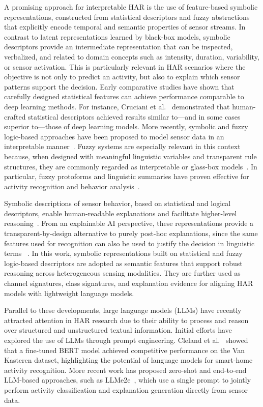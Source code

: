\documentclass[preprint,12pt]{elsarticle}
\begin{document}
A promising approach for interpretable HAR is the use of feature-based symbolic representations, constructed from statistical descriptors and fuzzy abstractions that explicitly encode temporal and semantic properties of sensor streams. In contrast to latent representations learned by black-box models, symbolic descriptors provide an intermediate representation that can be inspected, verbalized, and related to domain concepts such as intensity, duration, variability, or sensor activation. This is particularly relevant in HAR scenarios where the objective is not only to predict an activity, but also to explain which sensor patterns support the decision. Early comparative studies have shown that carefully designed statistical features can achieve performance comparable to deep learning methods. For instance, Cruciani et al.~\cite{cruciani2019comparing} demonstrated that human-crafted statistical descriptors achieved results similar to---and in some cases superior to---those of deep learning models. More recently, symbolic and fuzzy logic-based approaches have been proposed to model sensor data in an interpretable manner~\cite{yogeesh2024sensor}. Fuzzy systems are especially relevant in this context because, when designed with meaningful linguistic variables and transparent rule structures, they are commonly regarded as interpretable or glass-box models~\cite{alonso2015interpretability, cpalka2017design}. In particular, fuzzy protoforms and linguistic summaries have proven effective for activity recognition and behavior analysis~\cite{polo2024human}.

Symbolic descriptions of sensor behavior, based on statistical and logical descriptors, enable human-readable explanations and facilitate higher-level reasoning~\cite{li2025sensorllm, polo2025modelling}. From an explainable AI perspective, these representations provide a transparent-by-design alternative to purely post-hoc explanations, since the same features used for recognition can also be used to justify the decision in linguistic terms ~\cite{arrieta2020explainable}. In this work, symbolic representations built on statistical and fuzzy logic-based descriptors are adopted as semantic features that support robust reasoning across heterogeneous sensing modalities. They are further used as channel signatures, class signatures, and explanation evidence for aligning HAR models with lightweight language models.

Parallel to these developments, large language models (LLMs) have recently attracted attention in HAR research due to their ability to process and reason over structured and unstructured textual information. Initial efforts have explored the use of LLMs through prompt engineering. Cleland et al.~\cite{cleland2024leveraging} showed that a fine-tuned BERT model achieved competitive performance on the Van Kasteren dataset, highlighting the potential of language models for smart-home activity recognition. More recent work has proposed zero-shot and end-to-end LLM-based approaches, such as LLMe2e~\cite{fiori2025leveraging}, which use a single prompt to jointly perform activity classification and explanation generation directly from sensor data.
\end{document}
